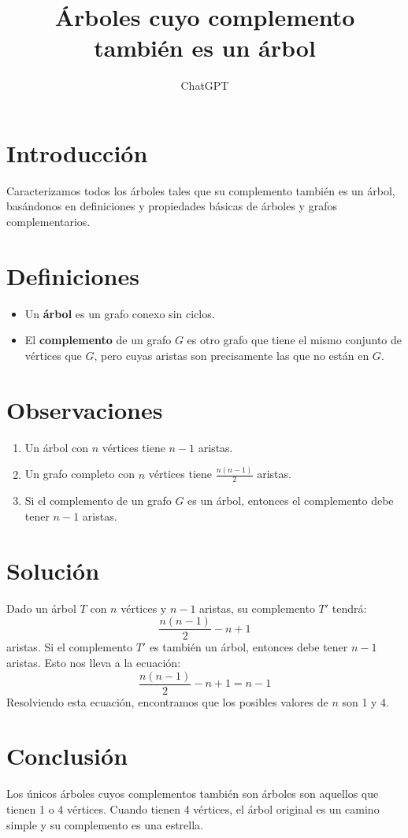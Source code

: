 \documentclass{article}
\begin{document}
\title{Árboles cuyo complemento también es un árbol}
\author{ChatGPT}
\maketitle

\section{Introducción}
Caracterizamos todos los árboles tales que su complemento también es un árbol, basándonos en definiciones y propiedades básicas de árboles y grafos complementarios.

\section{Definiciones}
\begin{itemize}
    \item Un \textbf{árbol} es un grafo conexo sin ciclos.
    \item El \textbf{complemento} de un grafo $G$ es otro grafo que tiene el mismo conjunto de vértices que $G$, pero cuyas aristas son precisamente las que no están en $G$.
\end{itemize}

\section{Observaciones}
\begin{enumerate}
    \item Un árbol con $n$ vértices tiene $n - 1$ aristas.
    \item Un grafo completo con $n$ vértices tiene $\frac{n(n - 1)}{2}$ aristas.
    \item Si el complemento de un grafo $G$ es un árbol, entonces el complemento debe tener $n - 1$ aristas.
\end{enumerate}

\section{Solución}
Dado un árbol $T$ con $n$ vértices y $n - 1$ aristas, su complemento $T'$ tendrá:
\[
\frac{n(n - 1)}{2} - n + 1
\]
aristas. Si el complemento $T'$ es también un árbol, entonces debe tener $n - 1$ aristas. Esto nos lleva a la ecuación:
\[
\frac{n(n - 1)}{2} - n + 1 = n - 1
\]
Resolviendo esta ecuación, encontramos que los posibles valores de $n$ son 1 y 4.

\section{Conclusión}
Los únicos árboles cuyos complementos también son árboles son aquellos que tienen 1 o 4 vértices. Cuando tienen 4 vértices, el árbol original es un camino simple y su complemento es una estrella.
\end{document}
